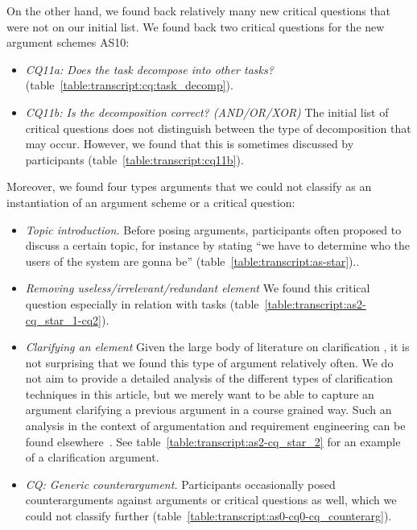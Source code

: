 \documentclass[11.5pt,two column]{llncs}
\newcommand\todo[4][]{%
	\ifthenelse{\equal{#1}{resolved}}{%
	}{%
		{\bf\color{red}TODO for #3\textcolor{gray}{(by #2)}: #4}%
	}%
}
\begin{document}
On the other hand, we found back relatively many new critical questions that were not on our initial list. We found back two critical questions for the new argument schemes AS10:
\begin{itemize}
\item \emph{CQ11a: Does the task decompose into other tasks?} (table~\ref{table:transcript:cq:task_decomp}).
\item \emph{CQ11b: Is the decomposition correct? (AND/OR/XOR)} The initial list of critical questions does not distinguish between the type of decomposition that may occur. However, we found that this is sometimes discussed by participants (table~\ref{table:transcript:cq11b}).
\end{itemize}
Moreover, we found four types arguments that we could not classify as an instantiation of an argument scheme or a critical question:
\begin{itemize}
\item \emph{Topic introduction.} Before posing arguments, participants often proposed to discuss a certain topic, for instance by stating ``we have to determine who the users of the system are gonna be'' (table~\ref{table:transcript:as-star})..
\item \emph{Removing useless/irrelevant/redundant element} We found this critical question especially in relation with tasks (table~\ref{table:transcript:as2-cq_star_1-cq2}).
\item \emph{Clarifying an element} Given the large body of literature on clarification \todo{Marc}{Marc}{add citations}, it is not surprising that we found this type of argument relatively often. We do not aim to provide a detailed analysis of the different types of clarification techniques in this article, but we merely want to be able to capture an argument clarifying a previous argument in a course grained way. Such an analysis in the context of argumentation and requirement engineering can be found elsewhere~\cite{Jureta:RE2008}. See table~\ref{table:transcript:as2-cq_star_2} for an example of a clarification argument.

\item \emph{CQ: Generic counterargument.} Participants occasionally posed counterarguments against arguments or critical questions as well, which we could not classify further (table~\ref{table:transcript:as0-cq0-cq_counterarg}).
\end{itemize}
\end{document}
